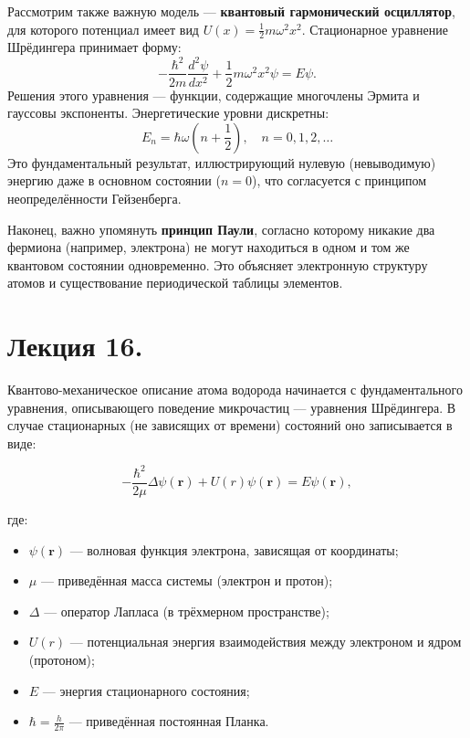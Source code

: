 \documentclass[12pt]{article}
\begin{document}
Рассмотрим также важную модель — \textbf{квантовый гармонический осциллятор}, для которого потенциал имеет вид $U(x) = \frac{1}{2} m \omega^2 x^2$. Стационарное уравнение Шрёдингера принимает форму:
\[
-\frac{\hbar^2}{2m} \frac{d^2 \psi}{dx^2} + \frac{1}{2} m \omega^2 x^2 \psi = E \psi.
\]
Решения этого уравнения — функции, содержащие многочлены Эрмита и гауссовы экспоненты. Энергетические уровни дискретны:
\[
E_n = \hbar \omega \left(n + \frac{1}{2}\right), \quad n = 0, 1, 2, \ldots
\]
Это фундаментальный результат, иллюстрирующий нулевую (невыводимую) энергию даже в основном состоянии ($n = 0$), что согласуется с принципом неопределённости Гейзенберга.

Наконец, важно упомянуть \textbf{принцип Паули}, согласно которому никакие два фермиона (например, электрона) не могут находиться в одном и том же квантовом состоянии одновременно. Это объясняет электронную структуру атомов и существование периодической таблицы элементов.







\section{Лекция 16. }

Квантово-механическое описание атома водорода начинается с фундаментального уравнения, описывающего поведение микрочастиц — уравнения Шрёдингера. В случае стационарных (не зависящих от времени) состояний оно записывается в виде:

\[
- \frac{\hbar^2}{2\mu} \Delta \psi(\mathbf{r}) + U(r) \psi(\mathbf{r}) = E \psi(\mathbf{r}),
\]

где:

\begin{itemize}
    \item $\psi(\mathbf{r})$ — волновая функция электрона, зависящая от координаты;
    \item $\mu$ — приведённая масса системы (электрон и протон);
    \item $\Delta$ — оператор Лапласа (в трёхмерном пространстве);
    \item $U(r)$ — потенциальная энергия взаимодействия между электроном и ядром (протоном);
    \item $E$ — энергия стационарного состояния;
    \item $\hbar = \frac{h}{2\pi}$ — приведённая постоянная Планка.
\end{itemize}
\end{document}
